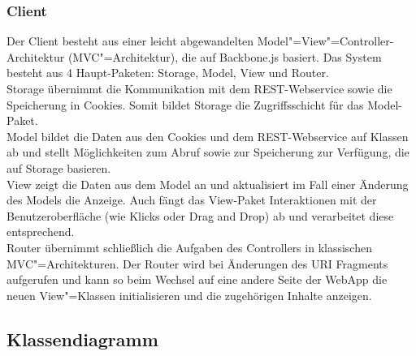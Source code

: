 \subsubsection{Client}
Der Client besteht aus einer leicht abgewandelten Model"=View"=Controller-Architektur (MVC"=Architektur), die auf Backbone.js \cite{backbone} basiert.
Das System besteht aus 4 Haupt-Paketen: Storage, Model, View und Router.\\
Storage übernimmt die Kommunikation mit dem REST-Webservice sowie die Speicherung in Cookies. Somit bildet Storage die Zugriffsschicht für das Model-Paket. \\
Model bildet die Daten aus den Cookies und dem REST-Webservice auf Klassen ab und stellt Möglichkeiten zum Abruf sowie zur Speicherung zur Verfügung, die auf Storage basieren.\\
View zeigt die Daten aus dem Model an und aktualisiert im Fall einer Änderung des Models die Anzeige. Auch fängt das View-Paket Interaktionen mit der Benutzeroberfläche (wie Klicks oder Drag and Drop) ab und verarbeitet diese entsprechend.\\
Router übernimmt schließlich die Aufgaben des Controllers in klassischen MVC"=Architekturen. Der Router wird bei Änderungen des URI Fragments aufgerufen und kann so beim Wechsel auf eine andere Seite der WebApp die neuen View"=Klassen initialisieren und die zugehörigen Inhalte anzeigen.

\subsection{Klassendiagramm}  %